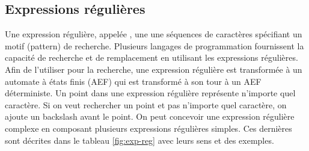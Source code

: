 \documentclass{KodeBook}
\begin{document}
\subsection{Expressions régulières}

Une expression régulière, appelée , une une séquences de caractères spécifiant un motif (pattern) de recherche.
Plusieurs langages de programmation fournissent la capacité de recherche et de remplacement en utilisant les expressions régulières. 
Afin de l'utiliser pour la recherche, une expression régulière est transformée à un automate à états finis (AEF) qui est transformé à son tour à un AEF déterministe.
Un point dans une expression régulière représente n'importe quel caractère.
Si on veut rechercher un point et pas n'importe quel caractère, on ajoute un backslash avant le point.
On peut concevoir une expression régulière complexe en composant plusieurs expressions régulières simples.
Ces dernières sont décrites dans le tableau \ref{fig:exp-reg} avec leurs sens et des exemples.
\end{document}
